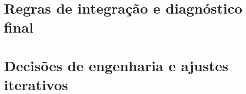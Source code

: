 

\section{Regras de integração e diagnóstico final}
\label{sec:regras_integracao}



\section{Decisões de engenharia e ajustes iterativos}
\label{sec:decisoes_engenharia}

